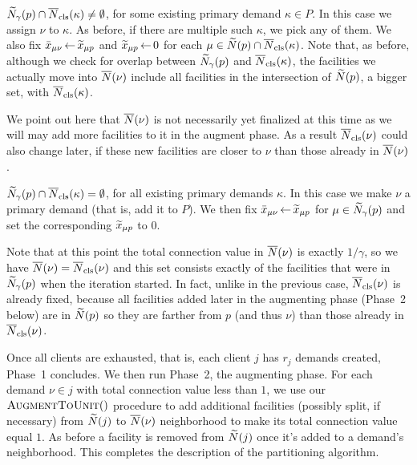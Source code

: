 \begin{description}
%
\item{} ${\widetilde N}_{\gamma}(p) \cap
  {\overline{N}}_{\text{cls}}(\kappa)\neq\emptyset$, for some existing primary demand
  $\kappa\in P$.  In this case we assign $\nu$ to $\kappa$. As before, if
  there are multiple such $\kappa$, we pick any of them. We also fix
  ${\bar x}_{\mu \nu} {\,\leftarrow\,} {\widetilde x}_{\mu p}$ and ${\widetilde x}_{\mu p}{\,\leftarrow\,} 0$
  for each $\mu \in {\widetilde N}(p)\cap {\overline{N}}_{\text{cls}}(\kappa)$. Note that, as before,
  although we check for overlap between ${\widetilde N}_{\gamma}(p)$ and
  ${\overline{N}}_{\text{cls}}(\kappa)$, the facilities we actually move into
  ${\overline{N}}(\nu)$ include all facilities in the intersection of
  ${\widetilde N}(p)$, a bigger set, with ${\overline{N}}_{\text{cls}}(\kappa)$. 

We point out here that ${\overline{N}}(\nu)$ is not necessarily yet finalized at this time
  as we will may add more facilities to it in the augment phase. As a
  result ${\overline{N}}_{\text{cls}}(\nu)$ could also change later, if these new facilities
  are closer to $\nu$ than those already in ${\overline{N}}(\nu)$.
%
\item{} ${\widetilde N}_{\gamma}(p) \cap {\overline{N}}_{\text{cls}}(\kappa) =
  \emptyset$, for all existing primary demands $\kappa$.  In this case
  we make $\nu$ a primary demand (that is, add it to $P$). We then fix ${\bar x}_{\mu \nu}{\,\leftarrow\,}
  {\widetilde x}_{\mu p}$ for $\mu \in {\widetilde N}_{\gamma}(p)$ and set the
  corresponding ${\widetilde x}_{\mu p}$ to $0$.  

	Note that at this point the total
  connection value in ${\overline{N}}(\nu)$ is exactly $1/\gamma$, so
  we have ${\overline{N}}(\nu) = {\overline{N}}_{\text{cls}}(\nu)$ and this set consists exactly of
  the facilities that were in ${\widetilde N}_{\gamma}(p)$ when the iteration started.
  In fact, unlike in the previous case,
  ${\overline{N}}_{\text{cls}}(\nu)$ is already fixed, because all facilities added
  later in the augmenting phase (Phase~2 below) are in ${\widetilde N}(p)$ so
  they are farther from $p$ (and thus $\nu$) than those already in ${\overline{N}}_{\text{cls}}(\nu)$.
%
\end{description}
%
Once all clients are exhausted, that is, each client $j$ has $r_j$
demands created, Phase~1 concludes. We then run Phase~2, the augmenting
phase.  For each demand $\nu\in j$ with total connection
value less than $1$, we use our ${\textsc{AugmentToUnit}}()$ procedure to add
additional facilities (possibly split, if necessary)
 from ${\widetilde N}(j)$ to ${\overline{N}}(\nu)$ neighborhood to
make its total connection value equal $1$. As before a facility is
removed from ${\widetilde N}(j)$ once it's added to a demand's neighborhood. 
This completes the description of the partitioning algorithm.

